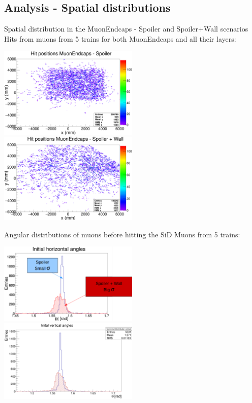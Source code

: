 \documentclass[xcolor={dvipsnames}]{beamer}
\begin{document}
\subsection{Analysis - Spatial distributions}
\begin{frame}{Spatial distribution in the MuonEndcaps - Spoiler and Spoiler+Wall scenarios}
Hits from muons from 5 trains for both MuonEndcaps and all their layers:
 \begin{center}
\includegraphics[width=0.5\textwidth]{Spatial_distribution_MuonEndcap_Spoiler.pdf}
\hspace*{0.1cm}
\includegraphics[width=0.5\textwidth]{Spatial_distribution_MuonEndcap_SpoilerWall.pdf}
\end{center}
\end{frame}
\begin{frame}{Angular distributions of muons before hitting the SiD}
Muons from 5 trains:
 \begin{center}
\includegraphics[width=0.5\textwidth]{horizontalAngular_distributions.pdf}
\hspace*{0.1cm}
\includegraphics[width=0.5\textwidth]{verticalAngular_distributions.pdf}
\end{center}
\end{frame}
\end{document}
